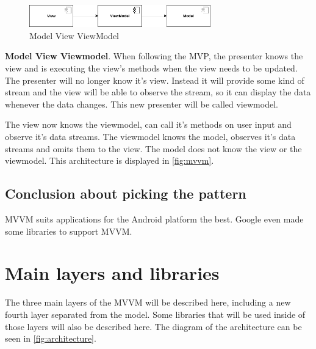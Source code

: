 \begin{figure}\centering
	\includegraphics[width=0.7\textwidth]{pics/patterns/bc-mvvm.png}
	\caption[MVVM]{Model View ViewModel}\label{fig:mvvm}
\end{figure}

\textbf{Model View Viewmodel}.
When following the MVP, the presenter knows the view and is executing the view's methods when the view needs to be updated.
The presenter will no longer know it's view.
Instead it will provide some kind of stream and the view will be able to observe the stream, so it can display the data whenever the data changes.
This new presenter will be called viewmodel.

The view now knows the viewmodel, can call it's methods on user input and observe it's data streams.
The viewmodel knows the model, observes it's data streams and omits them to the view.
The model does not know the view or the viewmodel.
This architecture is displayed in \autoref{fig:mvvm}.

\subsection{Conclusion about picking the pattern}
MVVM suits applications for the Android platform the best.
Google even made some libraries to support MVVM.

\section{Main layers and libraries}
The three main layers of the MVVM will be described here, including a new fourth layer separated from the model.
Some libraries that will be used inside of those layers will also be described here.
The diagram of the architecture can be seen in \autoref{fig:architecture}.

